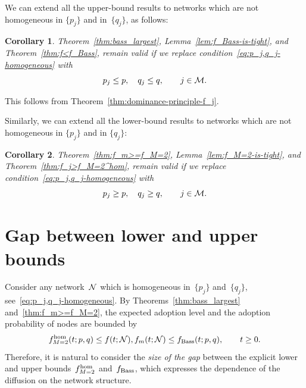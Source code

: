 \documentclass[review]{elsarticle}
\newtheorem{corollary}{Corollary}
\begin{document}
We can extend all the upper-bound results to networks which are not homogeneous in 
$\{p_j\}$ and in~$\{q_j\}$, as follows:
\begin{corollary}
	Theorem~\ref{thm:bass_largest}, Lemma~\ref{lem:f_Bass-is-tight}, 
	and  Theorem~\ref{thm:f<f_Bass},  
	remain valid if we replace  condition~\eqref{eq:p_j,q_j-homogeneous} with 
	\begin{equation}
		\label{eq:p_j,q_j<p,q}
		p_j \leq  p, \quad q_j \leq q, \qquad j\in {\cal M}.
	\end{equation} 
\end{corollary} 
\begin{pf}
This follows from Theorem~\ref{thm:dominance-principle-f_j}.
\end{pf}

Similarly, we can extend all the lower-bound results to networks which are not homogeneous in 
$\{p_j\}$ and in $\{q_j\}$: 
\begin{corollary}
	Theorem~\ref{thm:f_m>=f_M=2}, Lemma~\ref{lem:f_M=2-is-tight}, and  Theorem~\ref{thm:f_j>f_M=2^hom}, 
	remain valid if we replace condition~\eqref{eq:p_j,q_j-homogeneous} with 
	\begin{equation}
		\label{eq:p_j,q_j>=p,q}
		p_j \geq  p, \quad q_j \geq q, \qquad j\in {\cal M}.
	\end{equation}
\end{corollary}


\section{Gap between lower and upper bounds}
\label{sec:gap}

Consider any network~${\cal N}$ which is homogeneous in~$\{p_j\}$ and~$\{q_j\}$, see~\eqref{eq:p_j,q_j-homogeneous}.
By Theorems~\ref{thm:bass_largest} and~\ref{thm:f_m>=f_M=2}, the expected adoption level and the adoption probability of nodes are bounded by
  $$
f^{\rm hom}_{M=2}(t;p,q)\leq f(t;{\cal N}), f_m(t;{\cal N}) \leq f_{\rm Bass}(t;p,q),
\qquad t\ge 0.
$$  
Therefore, it is natural to consider the {\em size of the gap} between the explicit lower and upper bounds~$f_{M=2}^{\rm hom}$ and~$f_{\rm Bass}$,
which expresses the dependence of the diffusion on the network structure. 
\end{document}
